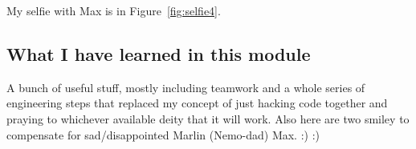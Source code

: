 
My selfie with Max is in  Figure~\ref{fig:selfie4}.

\subsection{What I have learned in this module}
A bunch of useful stuff, mostly including teamwork and a whole series of engineering steps that replaced my concept of just hacking code together and praying to whichever available deity that it will work.
Also here are two smiley to compensate for sad/disappointed Marlin (Nemo-dad) Max.
	:) :)
